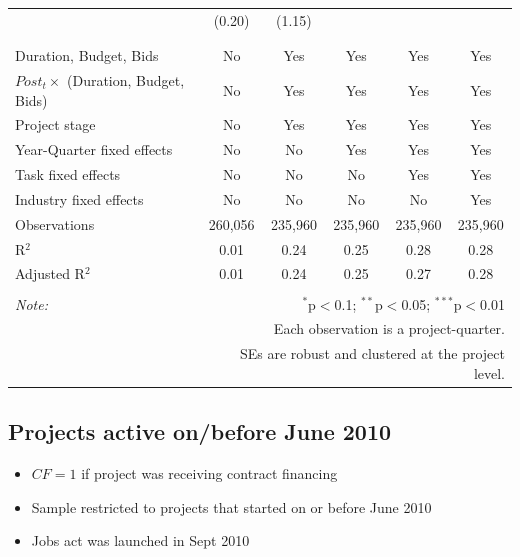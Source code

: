 \documentclass[
]{article}
\providecommand{\tightlist}{%
  \setlength{\itemsep}{0pt}\setlength{\parskip}{0pt}}
\begin{document}
\begin{table}[H]
\begin{tabular}{@{\extracolsep{-2pt}}lccccc}
  & (0.20) & (1.15) &  &  &  \\ 
  & & & & & \\ 
\hline \\[-1.8ex] 
Duration, Budget, Bids & No & Yes & Yes & Yes & Yes \\ 
$Post_t \times $  (Duration, Budget, Bids) & No & Yes & Yes & Yes & Yes \\ 
Project stage & No & Yes & Yes & Yes & Yes \\ 
Year-Quarter fixed effects & No & No & Yes & Yes & Yes \\ 
Task fixed effects & No & No & No & Yes & Yes \\ 
Industry fixed effects & No & No & No & No & Yes \\ 
Observations & 260,056 & 235,960 & 235,960 & 235,960 & 235,960 \\ 
R$^{2}$ & 0.01 & 0.24 & 0.25 & 0.28 & 0.28 \\ 
Adjusted R$^{2}$ & 0.01 & 0.24 & 0.25 & 0.27 & 0.28 \\ 
\hline 
\hline \\[-1.8ex] 
\textit{Note:}  & \multicolumn{5}{r}{$^{*}$p$<$0.1; $^{**}$p$<$0.05; $^{***}$p$<$0.01} \\ 
 & \multicolumn{5}{r}{Each observation is a project-quarter.} \\ 
 & \multicolumn{5}{r}{SEs are robust and clustered at the project level.} \\ 
\end{tabular} 
\end{table}

\hypertarget{projects-active-onbefore-june-2010}{%
\subsection{Projects active on/before June
2010}\label{projects-active-onbefore-june-2010}}

\begin{itemize}
\tightlist
\item
  \(CF=1\) if project was receiving contract financing
\item
  Sample restricted to projects that started on or before June 2010
\item
  Jobs act was launched in Sept 2010
\end{itemize}
\end{document}
